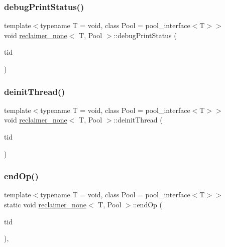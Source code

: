 \subsubsection{\texorpdfstring{debug\+Print\+Status()}{debugPrintStatus()}}
{\footnotesize\ttfamily template$<$typename T  = void, class Pool  = pool\+\_\+interface$<$\+T$>$$>$ \\
void \hyperlink{classreclaimer__none}{reclaimer\+\_\+none}$<$ T, Pool $>$\+::debug\+Print\+Status (\begin{DoxyParamCaption}\item[{const int}]{tid }\end{DoxyParamCaption})\hspace{0.3cm}{\ttfamily [inline]}}

\mbox{\label{classreclaimer__none_adf9a32c7d612d8929cd19908845757cf}} 
\subsubsection{\texorpdfstring{deinit\+Thread()}{deinitThread()}}
{\footnotesize\ttfamily template$<$typename T  = void, class Pool  = pool\+\_\+interface$<$\+T$>$$>$ \\
void \hyperlink{classreclaimer__none}{reclaimer\+\_\+none}$<$ T, Pool $>$\+::deinit\+Thread (\begin{DoxyParamCaption}\item[{const int}]{tid }\end{DoxyParamCaption})\hspace{0.3cm}{\ttfamily [inline]}}

\mbox{\label{classreclaimer__none_a07e8438b0ae46062974a5ee363c7804b}} 
\subsubsection{\texorpdfstring{end\+Op()}{endOp()}}
{\footnotesize\ttfamily template$<$typename T  = void, class Pool  = pool\+\_\+interface$<$\+T$>$$>$ \\
static void \hyperlink{classreclaimer__none}{reclaimer\+\_\+none}$<$ T, Pool $>$\+::end\+Op (\begin{DoxyParamCaption}\item[{const int}]{tid }\end{DoxyParamCaption})\hspace{0.3cm}{\ttfamily [inline]}, {\ttfamily [static]}}

